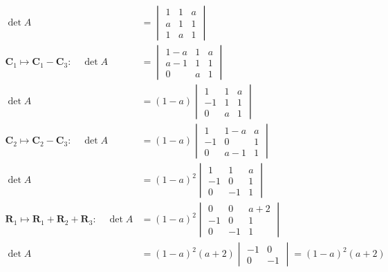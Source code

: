 \documentclass{article}
\begin{document}
\begin{align*}
	\det A                                                    & = \begin{vmatrix} 1 & 1 & a \\ a & 1 & 1 \\ 1 & a & 1 \end{vmatrix}                            \\
	\bm C_1 \mapsto \bm C_1 - \bm C_3:\quad \det A            & = \begin{vmatrix} 1-a & 1 & a \\ a-1 & 1 & 1 \\ 0 & a & 1 \end{vmatrix}                            \\
	\det A                                                    & = (1-a)\begin{vmatrix} 1 & 1 & a \\ -1 & 1 & 1 \\ 0 & a & 1 \end{vmatrix}                       \\
	\bm C_2 \mapsto \bm C_2 - \bm C_3:\quad \det A            & = (1-a)\begin{vmatrix} 1 & 1-a & a \\ -1 & 0 & 1 \\ 0 & a-1 & 1 \end{vmatrix}                       \\
	\det A                                                    & = (1-a)^2\begin{vmatrix} 1 & 1 & a \\ -1 & 0 & 1 \\ 0 & -1 & 1 \end{vmatrix}                     \\
	\bm R_1 \mapsto \bm R_1 + \bm R_2 + \bm R_3 :\quad \det A & = (1-a)^2\begin{vmatrix} 0 & 0 & a+2 \\ -1 & 0 & 1 \\ 0 & -1 & 1 \end{vmatrix}                     \\
	\det A                                                    & = (1-a)^2(a+2)\begin{vmatrix}-1&0\\0&-1\end{vmatrix} = (1-a)^2(a+2)
\end{align*}
\end{document}
